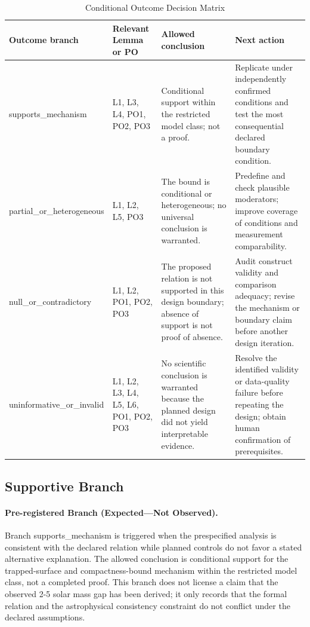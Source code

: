 \documentclass[conference]{IEEEtran}
\begin{document}
\begin{table}[htbp]
\centering
\footnotesize
\setlength{\tabcolsep}{3pt}
\renewcommand{\arraystretch}{1.12}
\caption{Conditional Outcome Decision Matrix}
\label{tab:expected-outcomes-eoc-decision-matrix}
\begin{tabular}{|p{}|p{}|p{}|p{}|}
\hline
Outcome branch & Relevant Lemma or PO & Allowed conclusion & Next action \\\hline
supports\_mechanism & L1, L3, L4, PO1, PO2, PO3 & Conditional support within the restricted model class; not a proof. & Replicate under independently confirmed conditions and test the most consequential declared boundary condition. \\\hline
partial\_or\_heterogeneous & L1, L2, L5, PO3 & The bound is conditional or heterogeneous; no universal conclusion is warranted. & Predefine and check plausible moderators; improve coverage of conditions and measurement comparability. \\\hline
null\_or\_contradictory & L1, L2, PO1, PO2, PO3 & The proposed relation is not supported in this design boundary; absence of support is not proof of absence. & Audit construct validity and comparison adequacy; revise the mechanism or boundary claim before another design iteration. \\\hline
uninformative\_or\_invalid & L1, L2, L3, L4, L5, L6, PO1, PO2, PO3 & No scientific conclusion is warranted because the planned design did not yield interpretable evidence. & Resolve the identified validity or data-quality failure before repeating the design; obtain human confirmation of prerequisites. \\\hline
\end{tabular}
\end{table}

\subsection{Supportive Branch}
\paragraph{Pre-registered Branch (Expected---Not Observed).} Branch supports\_mechanism is triggered when the prespecified analysis is consistent with the declared relation while planned controls do not favor a stated alternative explanation. The allowed conclusion is conditional support for the trapped-surface and compactness-bound mechanism within the restricted model class, not a completed proof. This branch does not license a claim that the observed 2-5 solar mass gap has been derived; it only records that the formal relation and the astrophysical consistency constraint do not conflict under the declared assumptions.
\end{document}
